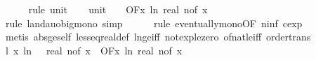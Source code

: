 \begin{isabellebody}
\ \ \ \ \isamarkupfalse%
\ {\isacharparenleft}{\kern0pt}rule\ unit{\isacharunderscore}{\kern0pt}{}{\isacharparenright}{\kern0pt}\isanewline
\isanewline
\ \ \isamarkupfalse%
\ unit{\isacharunderscore}{\kern0pt}{}{\isacharcolon}{\kern0pt}\ {\isachardoublequoteopen}{\isacharparenleft}{\kern0pt}{\isasymlambda}{\isacharunderscore}{\kern0pt}{\isachardot}{\kern0pt}\ {}{\isacharparenright}{\kern0pt}\ {\isasymin}\ O{\isacharbrackleft}{\kern0pt}{\isacharquery}{\kern0pt}F{\isacharbrackright}{\kern0pt}{\isacharparenleft}{\kern0pt}{\isasymlambda}x{\isachardot}{\kern0pt}\ ln\ {\isacharparenleft}{\kern0pt}real\ {\isacharparenleft}{\kern0pt}n{\isacharunderscore}{\kern0pt}of\ x{\isacharparenright}{\kern0pt}{\isacharparenright}{\kern0pt}{\isacharparenright}{\kern0pt}{\isachardoublequoteclose}\ \isanewline
\ \ \ \ \isamarkupfalse%
\ {\isacharparenleft}{\kern0pt}rule\ landau{\isacharunderscore}{\kern0pt}o{\isachardot}{\kern0pt}big{\isacharunderscore}{\kern0pt}mono{\isacharcomma}{\kern0pt}\ simp{\isacharparenright}{\kern0pt}\isanewline
\ \ \ \ \isamarkupfalse%
\ {\isacharparenleft}{\kern0pt}rule\ eventually{\isacharunderscore}{\kern0pt}mono{\isacharbrackleft}{\kern0pt}OF\ n{\isacharunderscore}{\kern0pt}inf{\isacharbrackleft}{\kern0pt}\ c{\isacharequal}{\kern0pt}{\isachardoublequoteopen}exp\ {}{\isachardoublequoteclose}{\isacharbrackright}{\kern0pt}{\isacharbrackright}{\kern0pt}{\isacharparenright}{\kern0pt}\isanewline
\ \ \ \ \isamarkupfalse%
\ {\isacharparenleft}{\kern0pt}metis\ abs{\isacharunderscore}{\kern0pt}ge{\isacharunderscore}{\kern0pt}self\ less{\isacharunderscore}{\kern0pt}eq{\isacharunderscore}{\kern0pt}real{\isacharunderscore}{\kern0pt}def\ ln{\isacharunderscore}{\kern0pt}ge{\isacharunderscore}{\kern0pt}iff\ not{\isacharunderscore}{\kern0pt}exp{\isacharunderscore}{\kern0pt}le{\isacharunderscore}{\kern0pt}zero\ of{\isacharunderscore}{\kern0pt}nat{\isacharunderscore}{\kern0pt}{}{\isacharunderscore}{\kern0pt}le{\isacharunderscore}{\kern0pt}iff\ order{\isachardot}{\kern0pt}trans{\isacharparenright}{\kern0pt}\isanewline
\isanewline
\ \ \isamarkupfalse%
\ l{}{\isacharcolon}{\kern0pt}\ {\isachardoublequoteopen}{\isacharparenleft}{\kern0pt}{\isasymlambda}x{\isachardot}{\kern0pt}\ ln\ {\isacharparenleft}{\kern0pt}{}{}\ {\isacharplus}{\kern0pt}\ real\ {\isacharparenleft}{\kern0pt}n{\isacharunderscore}{\kern0pt}of\ x{\isacharparenright}{\kern0pt}{\isacharparenright}{\kern0pt}{\isacharparenright}{\kern0pt}\ {\isasymin}\ O{\isacharbrackleft}{\kern0pt}{\isacharquery}{\kern0pt}F{\isacharbrackright}{\kern0pt}{\isacharparenleft}{\kern0pt}{\isasymlambda}x{\isachardot}{\kern0pt}\ ln\ {\isacharparenleft}{\kern0pt}real\ {\isacharparenleft}{\kern0pt}n{\isacharunderscore}{\kern0pt}of\ x{\isacharparenright}{\kern0pt}{\isacharparenright}{\kern0pt}{\isacharparenright}{\kern0pt}{\isachardoublequoteclose}\isanewline

\end{isabellebody}
